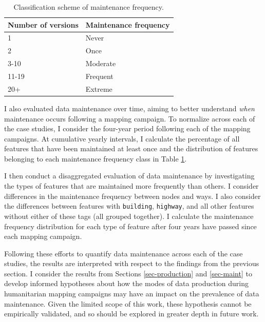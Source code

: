 \begin{table}[]
\centering
\caption{Classification scheme of maintenance frequency.}
\label{tab:freq}
\begin{tabular}{ll}
\toprule
Number of versions & Maintenance frequency \\
\midrule
1                  & Never                  \\
2                  & Once                  \\
3-10               & Moderate              \\
11-19              & Frequent              \\
20+                & Extreme               \\
\bottomrule
\end{tabular}
\end{table}

I also evaluated data maintenance over time, aiming to better understand \textit{when} maintenance occurs following a mapping campaign. To normalize across each of the case studies, I consider the four-year period following each of the mapping campaigns. At cumulative yearly intervals, I calculate the percentage of all features that have been maintained at least once and the distribution of features belonging to each maintenance frequency class in Table \ref{tab:freq}. 

I then conduct a disaggregated evaluation of data maintenance by investigating the types of features that are maintained more frequently than others. I consider differences in the maintenance frequency between nodes and ways. I also consider the differences between features with \texttt{building}, \texttt{highway}, and all other features without either of these tags (all grouped together). I calculate the maintenance frequency distribution for each type of feature after four years have passed since each mapping campaign. 

Following these efforts to quantify data maintenance across each of the case studies, the results are interpreted with respect to the findings from the previous section. I consider the results from Sections \ref{sec-production} and \ref{sec-maint} to develop informed hypotheses about how the modes of data production during humanitarian mapping campaigns may have an impact on the prevalence of data maintenance. Given the limited scope of this work, these hypothesis cannot be empirically validated, and so should be explored in greater depth in future work. 

